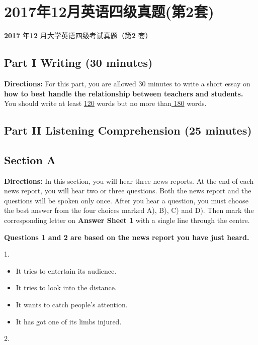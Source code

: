 \documentclass[UTF8,11pt]{ctexart}
\begin{document}
\section*{2017年12月英语四级真题(第2套)}
\textbf{2017} 年\textbf{12} 月大学英语四级考试真题（第\textbf{2} 套）


\subsection*{\textbf{Part I} \textbf{Writing} \textbf{(30 minutes)}}


\textbf{Directions:} For this part, you are allowed 30 minutes to write a short essay on\textbf{ how to best handle the relationship} \textbf{between teachers and students.} You should write at least \uline{120} words but no more than\uline{ 180} words.


\subsection*{\textbf{Part II} \textbf{Listening Comprehension} \textbf{(25 minutes)}}


\subsection*{\textbf{Section A}}


\textbf{Directions:} In this section, you will hear three news reports. At the end of each news report, you will hear two or three questions. Both the news report and the questions will be spoken only once. After you hear a question, you must choose the best answer from the four choices marked A), B), C) and D). Then mark the corresponding letter on\textbf{ Answer Sheet 1} with a single line through the centre.


\textbf{Questions 1 and 2 are based on the news report you have just heard.}


1.


\begin{itemize}[leftmargin=2em,itemsep=.2em,topsep=.4em]\item[A.] It tries to entertain its audience.
\item[B.] It tries to look into the distance.
\item[C.] It wants to catch people’s attention.
\item[D.] It has got one of its limbs injured.
\end{itemize}

2.
\end{document}
